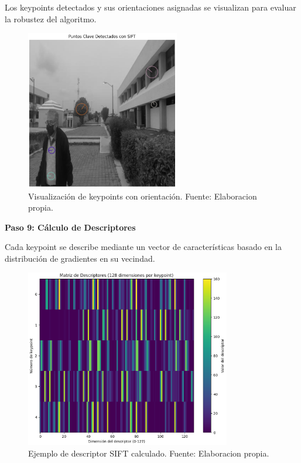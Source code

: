 \documentclass[a4paper]{article}
\begin{document}
Los keypoints detectados y sus orientaciones asignadas se visualizan para evaluar la robustez del algoritmo.

\begin{figure}[H]
    \centering
    \includegraphics[width=0.6\textwidth]{images/sift_paso_7.1.png}
    \caption{Visualización de keypoints con orientación. Fuente: Elaboracion propia.}
\end{figure}

\textbf{Paso 9: Cálculo de Descriptores}
\par\vspace{0.5cm}

Cada keypoint se describe mediante un vector de características basado en la distribución de gradientes en su vecindad.

\begin{figure}[H]
    \centering
    \includegraphics[width=0.8\textwidth]{images/sift_paso_8.png}
    \caption{Ejemplo de descriptor SIFT calculado. Fuente: Elaboracion propia.}
\end{figure}
\end{document}
